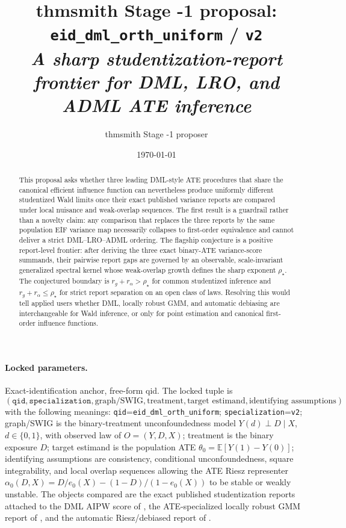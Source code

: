 \documentclass[11pt]{article}
\title{thmsmith Stage -1 proposal: \texttt{eid\_dml\_orth\_uniform} / \texttt{v2}%
  \\ \large\textit{A sharp studentization-report frontier for DML, LRO, and ADML ATE inference}}
\author{thmsmith Stage -1 proposer}
\date{\today}
\newcommand{\E}{\mathbb{E}}
\theoremstyle{definition}
\theoremstyle{plain}
\theoremstyle{remark}
\begin{document}
\maketitle


\paragraph{Locked parameters.}
Exact-identification anchor, free-form qid.  The locked tuple is
\[
(\texttt{qid},\texttt{specialization},\text{graph/SWIG},\text{treatment},\text{target estimand},\text{identifying assumptions})
\]
with the following meanings: \texttt{qid}=\texttt{eid\_dml\_orth\_uniform};
\texttt{specialization}=\texttt{v2}; graph/SWIG is the binary-treatment
unconfoundedness model \(Y(d)\perp D\mid X\), \(d\in\{0,1\}\), with observed
law of \(O=(Y,D,X)\); treatment is the binary exposure \(D\); target estimand
is the population ATE \(\theta_0=\E[Y(1)-Y(0)]\); identifying assumptions are
consistency, conditional unconfoundedness, square integrability, and local
overlap sequences allowing the ATE Riesz representer
\(\alpha_0(D,X)=D/e_0(X)-(1-D)/(1-e_0(X))\) to be stable or weakly unstable.
The objects compared are the exact published studentization reports attached
to the DML AIPW score of \citet{ChernozhukovEtAl2018ECTJ}, the
ATE-specialized locally robust GMM report of
\citet{ChernozhukovEscancianoIchimuraNeweyRobins2022LRO}, and the automatic
Riesz/debiased report of \citet{ChernozhukovNeweySingh2022ADML}.

\begin{abstract}
This proposal asks whether three leading DML-style ATE procedures that share
the canonical efficient influence function can nevertheless produce uniformly
different studentized Wald limits once their exact published variance reports
are compared under local nuisance and weak-overlap sequences.  The first
result is a guardrail rather than a novelty claim: any comparison that replaces
the three reports by the same population EIF variance map necessarily
collapses to first-order equivalence and cannot deliver a strict
DML--LRO--ADML ordering.  The flagship
conjecture is a positive report-level frontier: after deriving the three exact
binary-ATE variance-score summands, their pairwise report gaps are governed by
an observable, scale-invariant generalized spectral kernel whose weak-overlap
growth defines the sharp exponent \(\rho_\star\).  The conjectured boundary is
\(r_g+r_\alpha>\rho_\star\) for common studentized inference and
\(r_g+r_\alpha\le \rho_\star\) for strict report separation on an open class
of laws.  Resolving this would tell applied users whether DML, locally robust
GMM, and automatic debiasing are interchangeable for Wald inference, or only
for point estimation and canonical first-order influence functions.
\end{abstract}
\end{document}
